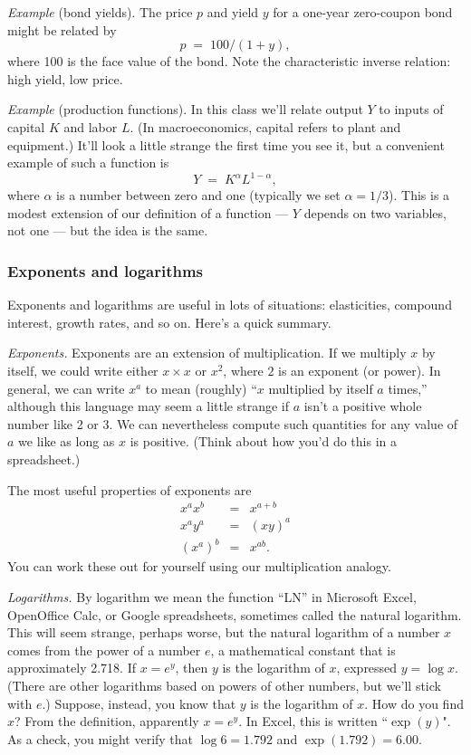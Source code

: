 \documentclass[letterpaper,12pt]{article}
\begin{document}
{\it Example} (bond yields).
The price $p$ and yield $y$ for a one-year zero-coupon bond
might be related by
\[
    p \;=\; 100/(1+y),
\]
where 100 is the face value of the bond.
Note the characteristic inverse relation:  high yield, low price.


{\it Example} (production functions).
In this class we'll relate output $Y$ to inputs of capital $K$ and labor $L$.
(In macroeconomics, capital refers to plant and equipment.)
It'll look a little strange the first time you see it,
but a convenient example of such a function is
\[
    Y \;=\; K^\alpha L^{1-\alpha} ,
\]
where $\alpha$ is a number between zero and one (typically we set $\alpha = 1/3$).
This is a modest extension of our definition of a function ---
$Y$ depends on two variables, not one ---
but the idea is the same.



\subsubsection*{Exponents and logarithms}

Exponents and logarithms are useful in lots of situations:
elasticities, compound interest, growth rates, and so on.
Here's a quick summary.

{\it Exponents.}
Exponents are an extension of multiplication.
If we multiply $x$ by itself, we could write either $ x \times x $ or $x^2$,
where $2$ is an exponent (or power).
In general, we can write $x^a$ to mean (roughly) ``$x$ multiplied by itself $a$ times,''
although this language may seem a little strange
if $a$ isn't a positive whole number like 2 or 3.
We can nevertheless compute such quantities for any value of $a$ we like
as long as $x$ is positive.
(Think about how you'd do this in a spreadsheet.)


The most useful properties of exponents are
\begin{eqnarray*}
    x^a x^b &=& x^{a+b} \\
    x^a y^a &=& (xy)^a \\
    (x^a)^b &=& x^{ab} .
\end{eqnarray*}
You can work these out for yourself using our multiplication analogy.


{\it Logarithms.}
By logarithm we mean the function ``LN'' in
Microsoft Excel, OpenOffice Calc, or Google spreadsheets,
sometimes called the natural logarithm.
This will seem strange, perhaps worse, but
the natural logarithm of a number $x$ comes from the power of a number $e$,
a mathematical constant that is approximately 2.718.
If $x = e^y$, then $y$ is the logarithm of $x$,
expressed $y = \log x $.
(There are other logarithms based on powers of other numbers,
but we'll stick with $e$.)
Suppose, instead, you know that $y$ is the logarithm of $x$.
How do you find $x$?  From the definition, apparently $x = e^y$.
In Excel, this is written ``$\exp(y)$".
As a check, you might verify that $ \log 6 = 1.792$ and $\exp(1.792) = 6.00$.
\end{document}
